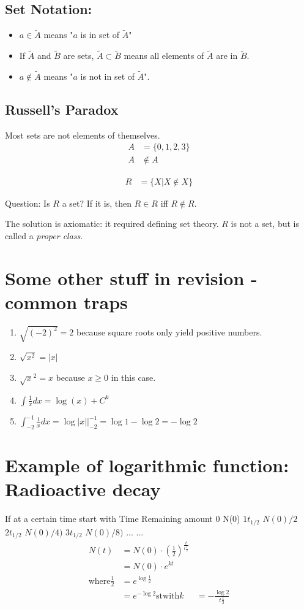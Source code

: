 \subsection{Set Notation:}
\begin{itemize}
  \item $a \in \tilde{A}$ means "$a$ is in set of $\tilde{A}$"
  \item If $\tilde{A}$ and $\tilde{B}$ are sets, $\tilde{A} \subset \tilde{B}$
        means all elements of $\tilde{A}$ are in $\tilde{B}$.
  \item $a \notin \tilde{A}$ means "$a$ is not in set of $\tilde{A}$".
\end{itemize}

\subsection{Russell's Paradox}
Most sets are not elements of themselves.
\begin{align}
  A &= \{ 0, 1, 2, 3 \} \\
  A &\notin A
\end{align}


\begin{align}
  R &= \{ X | X \notin X \}
\end{align}

Question: Is $R$ a set?
If it is, then $R \in R$ iff $R \notin R$.

The solution is axiomatic: it required defining set theory. $R$ is not a set,
but is called a \emph{proper class}.

\section{Some other stuff in revision - common traps}
\begin{enumerate}
  \item $\sqrt{(-2)^2} = 2$ because square roots only yield positive numbers.
  \item $\sqrt{x^2} = |x|$
  \item $\sqrt{x}^2 = x$ because $x \geq 0$ in this case.
  \item $\int{\frac{1}{x}dx} = \log(x) + C^k$
  \item $\int_{-2}^{-1}{\frac{1}{x}dx} = \log|x| |_{-2}^{-1} = \log1 - \log2 = -\log2$ %
\end{enumerate}

\section{Example of logarithmic function: Radioactive decay}
If at a certain time start with
Time    Remaining amount
0       N(0)
$1t_{1/2}$ $N(0)/2$
$2t_{1/2}$ $N(0)/4)$
$3t_{1/2}$ $N(0)/8)$
... ...
\begin{align}
N(t) &= N(0) \cdot (\frac{1}{2})^{\frac{t}{t\frac{1}{2}}} \\
     &= N(0) \cdot e^{kt} \\
\text{where} \frac{1}{2} &= e^{\log{\frac{1}{2}}} \\
&= e^{-\log2} \text{st}
\text{with} k &= -\frac{\log2}{t\frac{1}{2}}
\end{align}

